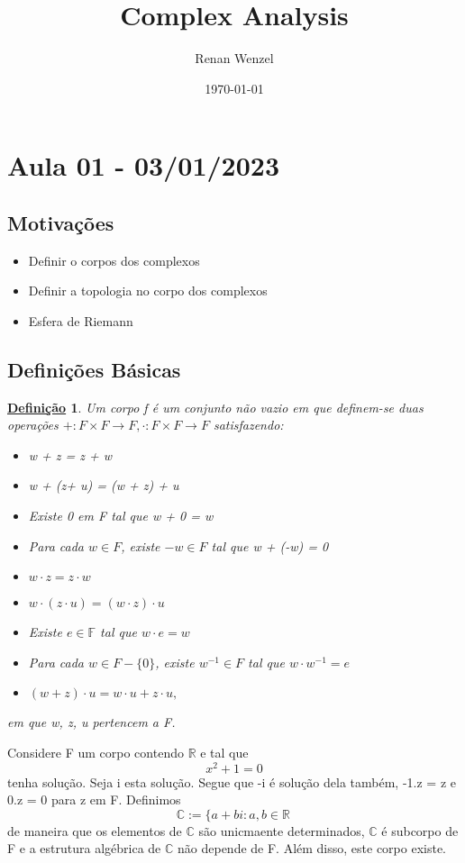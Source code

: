 \documentclass{article}
\title{Complex Analysis}
\author{Renan Wenzel}
\date{\today}
\newtheorem*{def*}{\underline{Defini\c c\~ao}}
\begin{document}
  \maketitle
  \newpage
  \tableofcontents
  \newpage

  \section{Aula 01 - 03/01/2023}
  \subsection{Motiva\c c\~oes}
  \begin{itemize}
   \item Definir o corpos dos complexos
   \item Definir a topologia no corpo dos complexos
   \item Esfera de Riemann
  \end{itemize}

  \subsection{Defini\c c\~oes B\'asicas}
  \begin{def*}
    Um corpo f \'e um conjunto n\~ao vazio em que definem-se duas opera\c c\~oes $+:F\times{F}\rightarrow F, \cdot:F\times{F}\rightarrow F$ satisfazendo:
  \begin{itemize}
    \item[i)] w + z = z + w
    \item[ii)] w + (z+ u) = (w + z) + u
    \item[iii)] Existe 0 em F tal que w + 0 = w
    \item[iv)] Para cada $w\in F$, existe $-w \in F$ tal que w + (-w) = 0
    \item[v)] $w\cdot z = z\cdot w$
    \item[vi)] $w\cdot(z\cdot u) = (w\cdot z)\cdot u$
    \item[vii)] Existe $e\in \mathbb{F}$ tal que $w\cdot{e} = w$
    \item[viii)] Para cada $w\in{F-\{0\}}$, existe $w ^{-1}\in{F}$ tal que $w\cdot w ^{-1} = e$
    \item[ix)] $(w+z)\cdot{u} = w\cdot u + z\cdot u,$
  \end{itemize}
  em que w, z, u pertencem a F.
  \end{def*}
  Considere F um corpo contendo $\mathbb{R}$ e tal que 
  $$
  x ^{2} + 1 = 0
  $$
tenha solu\c c\~ao. Seja i esta solu\c c\~ao. Segue que -i \'e solu\c c\~ao dela tamb\'em, -1.z = z e 0.z = 0 para z em F. Definimos
  $$
  \mathbb{C}:= \{a + bi: a, b\in \mathbb{R}\,
  $$
de maneira que os elementos de $\mathbb{C}$ s\~ao unicmaente determinados, $\mathbb{C}$ \'e subcorpo de F e a estrutura 
alg\'ebrica de $\mathbb{C}$ n\~ao depende de F. Al\'em disso, este corpo existe.
\end{document}
